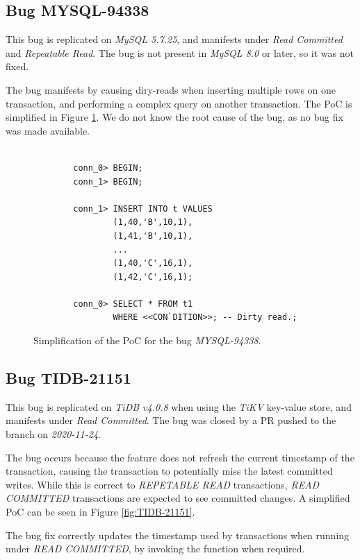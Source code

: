 \subsection*{Bug MYSQL-94338}

This bug is replicated on \textit{MySQL 5.7.25}, and manifests under \textit{Read Committed} and \textit{Repeatable Read}. The bug is not present in \textit{MySQL 8.0} or later, so it was not fixed.

The bug manifests by causing diry-reads when inserting multiple rows on one transaction, and performing a complex query on another transaction. The PoC is simplified in Figure \ref{fig:MYSQL-94338}. We do not know the root cause of the bug, as no bug fix was made available.

\begin{figure}
\begin{verbatim}

        conn_0> BEGIN;
        conn_1> BEGIN;

        conn_1> INSERT INTO t VALUES
                (1,40,'B',10,1),
                (1,41,'B',10,1),
                ...
                (1,40,'C',16,1),
                (1,42,'C',16,1);

        conn_0> SELECT * FROM t1
                WHERE <<CON`DITION>>; -- Dirty read.;
\end{verbatim}
\caption{Simplification of the PoC for the bug \textit{MYSQL-94338}.} \label{fig:MYSQL-94338}
\end{figure}

\subsection*{Bug TIDB-21151}

This bug is replicated on \textit{TiDB v4.0.8} when using the \textit{TiKV} key-value store, and manifests under \textit{Read Committed}. The bug was closed by a PR pushed to the  branch on \textit{2020-11-24}.

The bug occurs because the  feature does not refresh the current timestamp of the transaction, causing the transaction to potentially miss the latest committed writes. While this is correct to \textit{REPETABLE READ} transactions, \textit{READ COMMITTED} transactions are expected to see committed changes. A simplified PoC can be seen in Figure \ref{fig:TIDB-21151}. 

The bug fix correctly updates the timestamp used by transactions when running under \textit{READ COMMITTED}, by invoking the  function when required.

